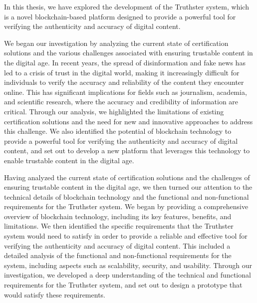 \documentclass[target=mst,aauheader=]{thud}
\begin{document}
In this thesis, we have explored the development of the Truthster system, which is a novel blockchain-based platform designed to provide a powerful tool for verifying the authenticity and accuracy of digital content.\par
We began our investigation by analyzing the current state of certification solutions and the various challenges associated with ensuring trustable content in the digital age. In recent years, the spread of disinformation and fake news has led to a crisis of trust in the digital world, making it increasingly difficult for individuals to verify the accuracy and reliability of the content they encounter online. This has significant implications for fields such as journalism, academia, and scientific research, where the accuracy and credibility of information are critical. Through our analysis, we highlighted the limitations of existing certification solutions and the need for new and innovative approaches to address this challenge. We also identified the potential of blockchain technology to provide a powerful tool for verifying the authenticity and accuracy of digital content, and set out to develop a new platform that leverages this technology to enable trustable content in the digital age.\par
Having analyzed the current state of certification solutions and the challenges of ensuring trustable content in the digital age, we then turned our attention to the technical details of blockchain technology and the functional and non-functional requirements for the Truthster system. We began by providing a comprehensive overview of blockchain technology, including its key features, benefits, and limitations. We then identified the specific requirements that the Truthster system would need to satisfy in order to provide a reliable and effective tool for verifying the authenticity and accuracy of digital content. This included a detailed analysis of the functional and non-functional requirements for the system, including aspects such as scalability, security, and usability. Through our investigation, we developed a deep understanding of the technical and functional requirements for the Truthster system, and set out to design a prototype that would satisfy these requirements.\par
\end{document}
